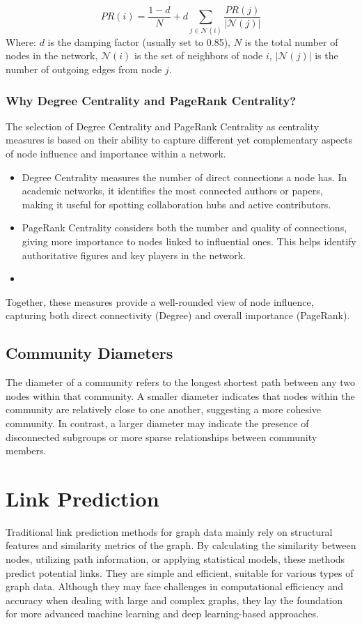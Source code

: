 \documentclass[11pt]{article}
\begin{document}
  \[
  PR(i) = \frac{1 - d}{N} + d \sum_{j \in \mathcal{N}(i)} \frac{PR(j)}{|\mathcal{N}(j)|}
  \]
  Where: 
  \( d \) is the damping factor (usually set to 0.85),
  \( N \) is the total number of nodes in the network,
  \( \mathcal{N}(i) \) is the set of neighbors of node \( i \),
  \( |\mathcal{N}(j)| \) is the number of outgoing edges from node \( j \).

\subsubsection{Why Degree Centrality and PageRank Centrality?}

The selection of Degree Centrality and PageRank Centrality as centrality measures is based on their ability to capture different yet complementary aspects of node influence and importance within a network.

\begin{itemize}
    \item Degree Centrality measures the number of direct connections a node has. In academic networks, it identifies the most connected authors or papers, making it useful for spotting collaboration hubs and active contributors.
    \item PageRank Centrality considers both the number and quality of connections, giving more importance to nodes linked to influential ones. This helps identify authoritative figures and key players in the network.
    \item 
\end{itemize}

Together, these measures provide a well-rounded view of node influence, capturing both direct connectivity (Degree) and overall importance (PageRank).


\subsection{Community Diameters}

The diameter of a community refers to the longest shortest path between any two nodes within that community. A smaller diameter indicates that nodes within the community are relatively close to one another, suggesting a more cohesive community. In contrast, a larger diameter may indicate the presence of disconnected subgroups or more sparse relationships between community members.

\section{Link Prediction}
Traditional link prediction methods for graph data mainly rely on structural features and similarity metrics of the graph. By calculating the similarity between nodes, utilizing path information, or applying statistical models, these methods predict potential links. They are simple and efficient, suitable for various types of graph data. Although they may face challenges in computational efficiency and accuracy when dealing with large and complex graphs, they lay the foundation for more advanced machine learning and deep learning-based approaches.
\end{document}
